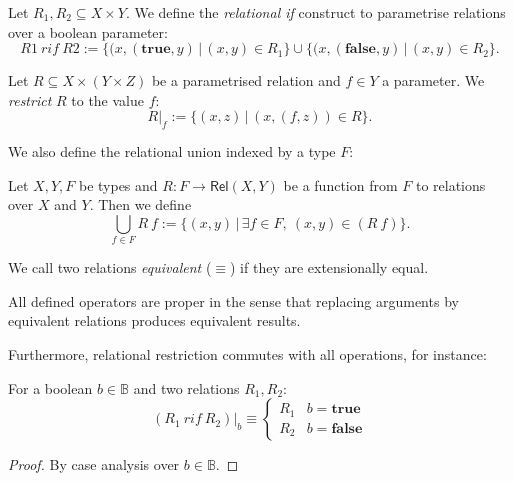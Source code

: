 \documentclass{psartcl}
\newcommand{\setOf}[1]{\bigl \{ #1 \bigr \}}
\newcommand{\setMap}[2]{\setOf{#1 \,\big|\, #2}}
\newcommand{\from}{:}
\renewcommand{\to}{\rightarrow}
\newcommand{\Bool}{\mathbb{B}}
\newcommand{\true}{\mathbf{true}}
\newcommand{\false}{\mathbf{false}}
\newcommand{\rif}{~ \mathit{rif} ~}
\newcommand{\at}[2][]{#1|_{#2}}
\newcommand{\Rel}{\mathsf{Rel}}
\begin{document}

\begin{definition}[Relational if]
  \label{def:rel-if}
  Let $R_1, R_2 \subseteq X \times Y$.  We define the \emph{relational if} construct to parametrise relations over a boolean parameter:
  $$R1 \rif R2 := \setMap{(x, (\true, y)}{(x, y) \in R_1} \cup \setMap{(x, (\false, y)}{(x, y) \in R_2}.$$
\end{definition}

\begin{definition}
  \label{def:rel-restr}
  Let $R \subseteq X \times (Y \times Z)$ be a parametrised relation and $f \in Y$ a parameter.  We \emph{restrict} $R$ to the value $f$:
  $$R\at{f} := \setMap{(x, z)}{(x, (f, z)) \in R}.$$
\end{definition}

We also define the relational union indexed by a type $F$:
\begin{definition}
  \label{def:rel-union}
  Let $X, Y, F$ be types and $R \from F \to \Rel(X, Y)$ be a function from $F$ to relations over $X$ and $Y$.  Then we define
  $$\bigcup_{f \in F}R~f := \setMap{(x, y)}{\exists f \in F,~(x, y) \in (R~f)}.$$
\end{definition}


We call two relations \emph{equivalent} ($\equiv$) if they are extensionally equal.

All defined operators are proper in the sense that replacing arguments by equivalent relations produces equivalent results.

Furthermore, relational restriction commutes with all operations, for instance:

\begin{lemma}
  For a boolean $b \in \Bool$ and two relations $R_1, R_2$:
  $$(R_1 \rif R_2)\at{b} \equiv
  \begin{cases}
    R_1 & b = \true \\
    R_2 & b = \false
  \end{cases} $$
\end{lemma}
\begin{proof}
  By case analysis over $b \in \Bool$.
\end{proof}
\end{document}
